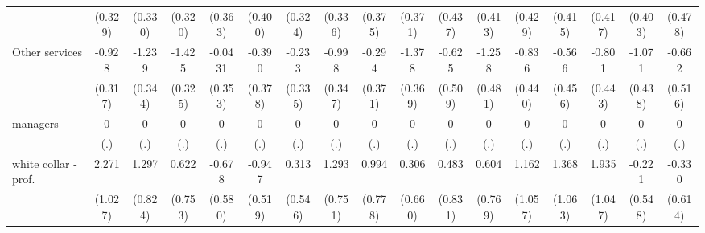 {\begin{tabular}{l*{16}{c}}
                    &     (0.329)         &     (0.330)         &     (0.320)         &     (0.363)         &     (0.400)         &     (0.324)         &     (0.336)         &     (0.375)         &     (0.371)         &     (0.437)         &     (0.413)         &     (0.429)         &     (0.415)         &     (0.417)         &     (0.403)         &     (0.478)         \\
[1em]
Other services      &      -0.928\sym{**} &      -1.239\sym{***}&      -1.425\sym{***}&     -0.0431         &      -0.390         &      -0.233         &      -0.998\sym{**} &      -0.294         &      -1.378\sym{***}&      -0.625         &      -1.258\sym{**} &      -0.836         &      -0.566         &      -0.801         &      -1.071\sym{*}  &      -0.662         \\
                    &     (0.317)         &     (0.344)         &     (0.325)         &     (0.353)         &     (0.378)         &     (0.335)         &     (0.347)         &     (0.371)         &     (0.369)         &     (0.509)         &     (0.481)         &     (0.440)         &     (0.456)         &     (0.443)         &     (0.438)         &     (0.516)         \\
[1em]
managers            &           0         &           0         &           0         &           0         &           0         &           0         &           0         &           0         &           0         &           0         &           0         &           0         &           0         &           0         &           0         &           0         \\
                    &         (.)         &         (.)         &         (.)         &         (.)         &         (.)         &         (.)         &         (.)         &         (.)         &         (.)         &         (.)         &         (.)         &         (.)         &         (.)         &         (.)         &         (.)         &         (.)         \\
[1em]
white collar - prof.&       2.271\sym{*}  &       1.297         &       0.622         &      -0.678         &      -0.947         &       0.313         &       1.293         &       0.994         &       0.306         &       0.483         &       0.604         &       1.162         &       1.368         &       1.935         &      -0.221         &      -0.330         \\
                    &     (1.027)         &     (0.824)         &     (0.753)         &     (0.580)         &     (0.519)         &     (0.546)         &     (0.751)         &     (0.778)         &     (0.660)         &     (0.831)         &     (0.769)         &     (1.057)         &     (1.063)         &     (1.047)         &     (0.548)         &     (0.614)         \\

\end{tabular}}
